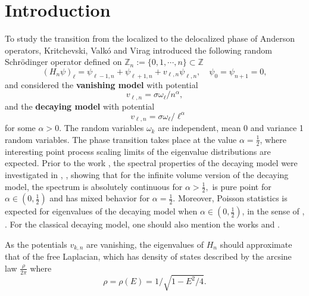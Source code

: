 \documentclass[12pt, reqno]{amsart}
\theoremstyle{definition}
\theoremstyle{remark}
\numberwithin{equation}{section}
\begin{document}
\section{Introduction}
To study the transition from the localized to the delocalized phase of Anderson operators, Kritchevski, Valkó and Virag \cite{kritchevski2011scaling} introduced the following random Schrödinger operator defined on $\mathbb{Z}_n:=\{0,1,\cdots,n\}\subset\mathbb{Z}$
\begin{equation}
    (H_n\psi)_\ell=\psi_{\ell-1,n}+\psi_{\ell+1,n}+v_{\ell,n}\psi_{\ell,n},\quad \psi_0=\psi_{n+1}=0,
\end{equation}
and considered the \textbf{vanishing model} with potential 
\begin{equation}\label{vanishing}
    v_{\ell,n}=\sigma \omega_\ell/n^\alpha,
\end{equation}
and the \textbf{decaying model} with potential
\begin{equation}\label{decaying}
    \quad v_{\ell,n}=\sigma \omega_\ell/\ell^\alpha
\end{equation}
for some $\alpha>0$. The random variables $\omega_k$ are independent, mean 0 and variance 1 random variables. The phase transition takes place at the value $\alpha=\frac{1}{2}$, where interesting point process scaling limits of the eigenvalue distributions are expected. Prior to the work \cite{kritchevski2011scaling}, the spectral properties of the decaying model were investigated in \cite{kotani1988one}, \cite{kiselev1998modified}, showing that for the infinite volume version of the decaying model, the spectrum is absolutely continuous for $\alpha>\frac{1}{2},$ is pure point for $\alpha\in(0,\frac{1}{2})$ and has mixed behavior for $\alpha=\frac{1}{2}.$ Moreover, Poisson statistics is expected for eigenvalues of the decaying model when $\alpha\in(0,\frac{1}{2})$, in the sense of \cite{minami1996local}, \cite{germinet2014spectral}. For the classical decaying model, one should also mention the works \cite{killip2007eigenfunction} and \cite{minami2007theory}.


As the potentials $v_{k,n}$ are vanishing, the eigenvalues of $H_n$ should approximate that of the free Laplacian, which has density of states described by the arcsine law $\frac{\rho}{2\pi}$ where
\begin{equation}\label{largevolume}
    \rho=\rho(E)=1/\sqrt{1-E^2/4}.
\end{equation}
\end{document}
